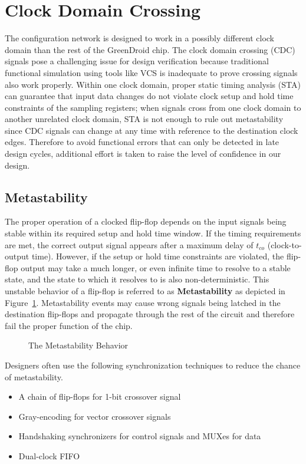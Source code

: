 \documentclass[12pt]{article}
\newcommand{\reffig}[1]{Figure~\ref{#1}}
\begin{document}
\section{Clock Domain Crossing} \label{cdc}
The configuration network is designed to work in a possibly different clock
domain than the rest of the GreenDroid chip. The clock domain crossing (CDC)
signals pose a challenging issue for design verification because traditional
functional simulation using tools like VCS is inadequate to prove crossing
signals also work properly. Within one clock domain, proper static timing
analysis (STA) can guarantee that input data changes do not violate clock setup
and hold time constraints of the sampling registers; when signals cross from
one clock domain to another unrelated clock domain, STA is not enough to rule
out metastability since CDC signals can change at any time with reference to
the destination clock edges. Therefore to avoid functional errors that can only
be detected in late design cycles, additional effort is taken to raise the
level of confidence in our design.

\subsection{Metastability} \label{meta}
The proper operation of a clocked flip-flop depends on the input signals being
stable within its required setup and hold time window. If the timing
requirements are met, the correct output signal appears after a maximum delay
of $t_{co}$ (clock-to-output time). However, if the setup or hold time constraints
are violated, the flip-flop output may take a much longer, or even infinite
time to resolve to a stable state, and the state to which it resolves to is
also non-deterministic. This unstable behavior of a flip-flop is referred to as
\textbf{Metastability} as depicted in \reffig{fig:metastability}.
Metastability events may cause wrong signals being latched in the destination
flip-flops and propagate through the rest of the circuit and therefore fail
the proper function of the chip.

\begin{figure}[ht]
\centering

\caption{The Metastability Behavior}
\label{fig:metastability}
\end{figure}

Designers often use the following synchronization techniques
\cite{cadence2004tp} to reduce the chance of metastability.
\begin{itemize}
\item A chain of flip-flops for 1-bit crossover signal
\item Gray-encoding for vector crossover signals
\item Handshaking synchronizers for control signals and MUXes for data
\item Dual-clock FIFO
\end{itemize}
\end{document}
